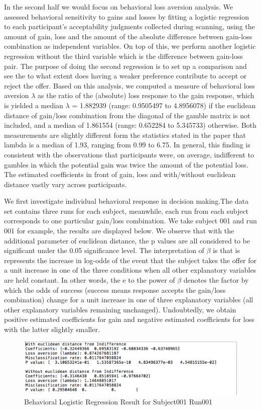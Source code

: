 \par \indent In the second half we would focus on behavioral loss aversion
analysis. We assessed behavioral sensitivity to gains and losses by fitting a
logistic regression to each participant's acceptability judgments collected 
during scanning, using the amount of gain, loss and the amount of the absolute 
difference between gain-loss combination as independent variables. On top of
this, we perform another logistic regression without the third variable which 
is the difference between gain-loss pair. The purpose of doing the second
regression is to set up a comparison and see the to what extent does  having a 
weaker preference contribute to accept or reject the offer. Based on this 
analysis, we computed a measure of behavioral loss aversion $\lambda$ as the ratio
of the (absolute) loss response to the gain response, which is yielded a median
$\lambda$ = 1.882939 (range: 0.9505497 to 4.8956078) if the euclidean distance of 
gain/loss combination from the diagonal of the gamble matrix is not included, 
and a median of 1.861554 (range: 0.652284 to 5.345733) otherwise. Both
measurements are slightly different form the statistics stated in the paper that
lambda is a median of 1.93, ranging from 0.99 to 6.75. In general, this finding
is consistent with the observations that participants were, on average,
indifferent to gambles in which the potential gain was twice the amount of the 
potential loss. The estimated coefficients in front of gain, loss and 
with/without euclidean distance vastly vary across participants. 
    
\par \indent We first investigate individual behavioral response in decision 
making.The data set contains three runs for each subject, meanwhile, each run 
from each subject corresponds to one particular gain/loss combination. We take 
subject 001 and run 001 for example, the results are displayed below. We observe 
that with the additional parameter of euclidean distance, the p values are all 
considered
to be significant under the 0.05 significance level. The interpretation of $\beta$
is that is represents the increase in log-odds of the event that the subject 
takes the offer for a unit increase in one of the three conditions when all 
other explanatory variables are held constant. In other words, the e to the 
power of $\beta$ denotes the factor by which the odds of success (success means
response accepts the gain/loss combination) change for a unit increase in one
of three explanatory variables (all other explanatory variables remaining 
unchanged). Undoubtedly, we obtain positive estimated coefficients for gain and
negative estimated coefficients for loss with the latter slightly smaller. 

\begin {figure}[!ht]
\centering
\includegraphics[width=120mm]{images/Sub001Run001.png}
\caption{Behavioral Logistic Regression Result for Subject001 Run001}
\label{fig:Logistic Regression}
\end{figure}

